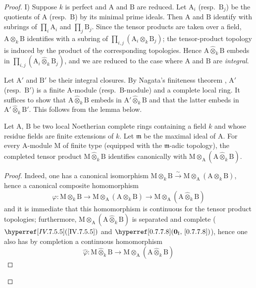 \begin{proof}
I) Suppose $k$ is perfect and $\mathrm{A}$ and $\mathrm{B}$ are reduced. Let $\mathrm{A}_i$ (resp.\ $\mathrm{B}_j$) be the quotients of $\mathrm{A}$ (resp.\ $\mathrm{B}$) by its minimal prime ideals. Then $\mathrm{A}$ and $\mathrm{B}$ identify with subrings of $\prod_i\mathrm{A}_i$ and $\prod_j\mathrm{B}_j$. Since the tensor products are taken over a field, $\mathrm{A}\otimes_k\mathrm{B}$ identifies with a subring of $\prod_{i,j}(\mathrm{A}_i\otimes_k\mathrm{B}_j)$; the tensor-product topology is induced by the product of the corresponding topologies. Hence $\mathrm{A}\widehat{\otimes}_k\mathrm{B}$ embeds in $\prod_{i,j}(\mathrm{A}_i\widehat{\otimes}_k\mathrm{B}_j)$, and we are reduced to the case where $\mathrm{A}$ and $\mathrm{B}$ are \emph{integral}.

Let $\mathrm{A}'$ and $\mathrm{B}'$ be their integral closures. By Nagata's finiteness theorem , $\mathrm{A}'$ (resp.\ $\mathrm{B}'$) is a finite $\mathrm{A}$-module (resp.\ $\mathrm{B}$-module) and a complete local ring. It suffices to show that $\mathrm{A}\widehat{\otimes}_k\mathrm{B}$ embeds in $\mathrm{A}'\widehat{\otimes}_k\mathrm{B}$ and that the latter embeds in $\mathrm{A}'\widehat{\otimes}_k\mathrm{B}'$. This follows from the lemma below.

\begin{lemma}[7.5.7.1]
\label{IV.7.5.7.1}
Let $\mathrm{A}$, $\mathrm{B}$ be two local Noetherian complete rings containing a field $k$ and whose residue fields are finite extensions of $k$. Let $\mathfrak{m}$ be the maximal ideal of $\mathrm{A}$. For every $\mathrm{A}$-module $\mathrm{M}$ of finite type (equipped with the $\mathfrak{m}$-adic topology), the completed tensor product $\mathrm{M}\widehat{\otimes}_k\mathrm{B}$  identifies canonically with $\mathrm{M}\otimes_\mathrm{A}(\mathrm{A}\widehat{\otimes}_k\mathrm{B})$.
\end{lemma}

\begin{proof}
Indeed, one has a canonical isomorphism $\mathrm{M}\otimes_k\mathrm{B}\xrightarrow{\sim}\mathrm{M}\otimes_\mathrm{A}(\mathrm{A}\otimes_k\mathrm{B})$, hence a canonical composite homomorphism
\[
  \varphi:\mathrm{M}\otimes_k\mathrm{B}
  \longrightarrow\mathrm{M}\otimes_\mathrm{A}(\mathrm{A}\otimes_k\mathrm{B})
  \longrightarrow\mathrm{M}\otimes_\mathrm{A}(\mathrm{A}\widehat{\otimes}_k\mathrm{B})
\]
and it is immediate that this homomorphism is continuous for the tensor product topologies; furthermore, $\mathrm{M}\otimes_\mathrm{A}(\mathrm{A}\widehat{\otimes}_k\mathrm{B})$ is separated and complete ($\sref{IV.7.5.5}$ and $\sref[0\textsubscript{\mdseries I}]{0.7.7.8}$), hence one also has by completion a continuous homomorphism
\[
  \widehat{\varphi}:\mathrm{M}\widehat{\otimes}_k\mathrm{B}\to\mathrm{M}\otimes_\mathrm{A}(\mathrm{A}\widehat{\otimes}_k\mathrm{B})
\]


\end{proof}
\end{proof}
